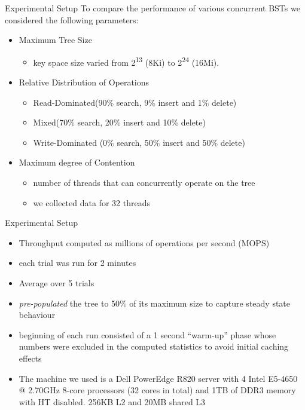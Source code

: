 \begin{frame}{Experimental Setup}
To compare the performance of various concurrent BSTs we considered the following parameters:
\begin{itemize}
\item Maximum Tree Size
  \begin{itemize}
  \item key space size varied from 2\textsuperscript{13} (8Ki) to 2\textsuperscript{24} (16Mi).
  \end{itemize}
\item Relative Distribution of Operations
  \begin{itemize}
  \item Read-Dominated\phantom{1}(90\% search, \phantom{1}9\% insert and \phantom{1}1\% delete)
  \item Mixed\phantom{1234567890}(70\% search, 20\% insert and 10\% delete)
  \item Write-Dominated (\phantom{1}0\% search, 50\% insert and 50\% delete)
  \end{itemize}
\item Maximum degree of Contention
  \begin{itemize}
  \item number of threads that can concurrently operate on the tree
  \item we collected data for 32 threads
  \end{itemize}
\end{itemize}
\end{frame}

\begin{frame}{Experimental Setup}
\small
{
\begin{itemize}
\item Throughput computed as millions of operations per second (MOPS)
\item each trial was run for 2 minutes
\item Average over 5 trials
\item \textit{pre-populated} the tree to 50\% of its maximum size to capture steady state behaviour
\item beginning of each run consisted of a 1 second ``warm-up'' phase whose numbers were excluded in the computed statistics to avoid initial caching effects
\item The machine we used is a Dell PowerEdge R820 server with 4 Intel E5-4650 @ 2.70GHz 8-core processors (32 cores in total) and 1TB of DDR3 memory with HT disabled. 256KB L2 and 20MB shared L3
\end{itemize}
}
\end{frame}

